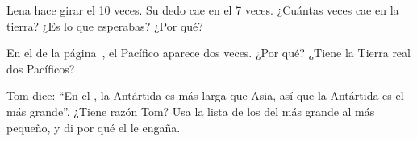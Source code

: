 \begin{exercise}[$\star\star$]\label{exo:g3:continents-and-oceans:8}
Lena hace girar el  10 veces. Su dedo cae en el  7 veces.
¿Cuántas veces cae en la tierra? ¿Es lo que esperabas? ¿Por qué?
\end{exercise}

\begin{exercise}[$\star\star$]\label{exo:g3:continents-and-oceans:9}
En el  de la página~\pageref{fig:g3:continents-and-oceans:world-map},
el  Pacífico aparece dos veces. ¿Por qué? ¿Tiene la Tierra real dos
 Pacíficos?
\end{exercise}

\begin{exercise}[$\star\star\star$]\label{exo:g3:continents-and-oceans:10}
Tom dice: ``En el , la Antártida es más larga que Asia, así que la
Antártida es el  más grande''. ¿Tiene razón Tom? Usa la lista de
los  del más grande al más pequeño, y di por qué el  le
engaña.
\end{exercise}
